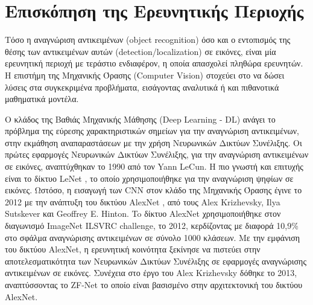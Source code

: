 \chapter{Επισκόπηση της Ερευνητικής Περιοχής}
\label{chapter:sota}
Τόσο η αναγνώριση αντικειμένων (object recognition) όσο και ο εντοπισμός
της θέσης των αντικειμένων αυτών (detection/localization) σε εικόνες,
είναι μία ερευνητική περιοχή με τεράστιο ενδιαφέρον,
η οποία απασχολεί πληθώρα ερευνητών. Η επιστήμη της Μηχανικής Όρασης (Computer Vision) %
στοχεύει στο να δώσει λύσεις στα συγκεκριμένα προβλήματα, εισάγοντας αναλυτικά
ή και πιθανοτικά μαθηματικά μοντέλα.

Ο κλάδος της Βαθιάς Μηχανικής Μάθησης (Deep Learning - DL) \cite{Goodfellow-et-al-2016-Book}
ανάγει το πρόβλημα της εύρεσης χαρακτηριστικών σημείων για την αναγνώριση αντικειμένων,
στην εκμάθηση αναπαραστάσεων \cite{bengio2013representation}
με την χρήση Νευρωνικών Δικτύων Συνέλιξης. %
Οι πρώτες εφαρμογές Νευρωνικών Δικτύων Συνέλιξης, για την αναγνώριση αντικειμένων
σε εικόνες, αναπτύχθηκαν το 1990 από τον Yann LeCun.
Η πιο γνωστή και επιτυχής είναι το δίκτυο LeNet \cite{lecun1998gradient}, το οποίο
χρησιμοποιήθηκε για την αναγνώριση ψηφίων σε εικόνες.
Ωστόσο, η εισαγωγή των CNN στον κλάδο της Μηχανικής Όρασης έγινε το 2012 με
την ανάπτυξη του δικτύου AlexNet \cite{NIPS2012_4824}, από τους Alex Krizhevsky,
Ilya Sutskever και Geoffrey E. Hinton. To δίκτυο AlexNet χρησιμοποιήθηκε
στον διαγωνισμό ImageNet ILSVRC challenge, το 2012, κερδίζοντας με διαφορά
10,9\% στο σφάλμα αναγνώρισης αντικειμένων σε σύνολο 1000 κλάσεων.
Με την εμφάνιση του δικτύου AlexNet, η ερευνητική κοινότητα ξεκίνησε να
πιστεύει στην αποτελεσματικότητα των Νευρωνικών Δικτύων Συνέλιξης σε εφαρμογές αναγνώρισης
αντικειμένων σε εικόνες. Συνέχεια στο έργο του Alex Krizhevsky δόθηκε το 2013,
αναπτύσσοντας το ZF-Net \cite{DBLP:journals/corr/ZeilerF13} το οποίο είναι
βασισμένο στην αρχιτεκτονική του δικτύου AlexNet.


